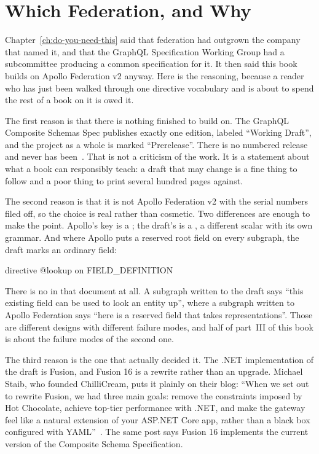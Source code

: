 \section{Which Federation, and Why}
\label{sec:ch05-which-federation-and-why}

%
Chapter~\ref{ch:do-you-need-this} said that federation had outgrown the company
that named it, and that the GraphQL Specification Working Group had a
subcommittee producing a common specification for it. It then said this book
builds on Apollo Federation v2 anyway. Here is the reasoning, because a reader
who has just been walked through one directive vocabulary and is about to
spend the rest of a book on it is owed it.

%
The first reason is that there is nothing finished to build on. The GraphQL
Composite Schemas Spec publishes exactly one edition, labeled \enquote{Working
Draft}, and the project as a whole is marked \enquote{Prerelease}. There is no
numbered release and never has been~\autocite{compositeschemasspec}. That is not
a criticism of the work. It is a statement about what a book can responsibly
teach: a draft that may change is a fine thing to follow and a poor thing to
print several hundred pages against.

%
The second reason is that it is not Apollo Federation v2 with the serial
numbers filed off, so the choice is real rather than cosmetic. Two differences
are enough to make the point. Apollo's key is a ; the draft's is
a , a different scalar with its own grammar. And where
Apollo puts a reserved root field on every subgraph, the draft marks an ordinary
field:

\begin{graphqlsdl}
directive @lookup on FIELD_DEFINITION
\end{graphqlsdl}

%
There is no  in that document at all. A subgraph written to the
draft says \enquote{this existing field can be used to look an entity up}, where
a subgraph written to Apollo Federation says \enquote{here is a reserved field
that takes representations}. Those are different designs with different failure
modes, and half of part~III of this book is about the failure modes of the
second one.

%
The third reason is the one that actually decided it. The .NET implementation
of the draft is Fusion, and Fusion 16 is a rewrite rather than an upgrade.
Michael Staib, who founded ChilliCream, puts it plainly on their blog:
\enquote{When we set out to rewrite Fusion, we had three main goals: remove the
constraints imposed by Hot Chocolate, achieve top-tier performance with .NET,
and make the gateway feel like a natural extension of your ASP.NET Core app,
rather than a black box configured with YAML}~\autocite{staib2026fusion16}. The
same post says Fusion 16 implements the current version of the Composite Schema
Specification.


